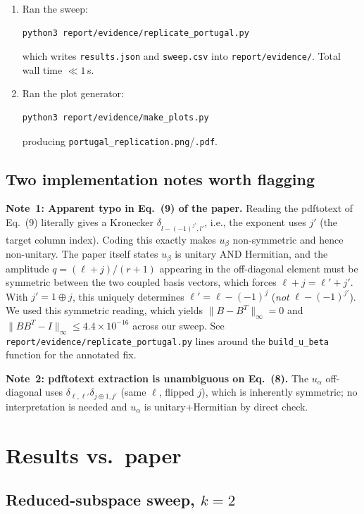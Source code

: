 \documentclass[11pt]{article}
\begin{document}
\begin{enumerate}[leftmargin=*,itemsep=0.2em]
        (correctness anchor).
  \item Ran the sweep:
    \begin{lstlisting}
python3 report/evidence/replicate_portugal.py
    \end{lstlisting}
    which writes \texttt{results.json} and \texttt{sweep.csv} into
    \texttt{report/evidence/}. Total wall time $\ll 1$\,s.
  \item Ran the plot generator:
    \begin{lstlisting}
python3 report/evidence/make_plots.py
    \end{lstlisting}
    producing \texttt{portugal\_replication.png}/\texttt{.pdf}.
\end{enumerate}

\subsection{Two implementation notes worth flagging}
\label{sec:implnotes}

\textbf{Note~1: Apparent typo in Eq.~(9) of the paper.} Reading the pdftotext
of Eq.~(9) literally gives a Kronecker $\delta_{l - (-1)^{j'}, l'}$, i.e.,
the exponent uses $j'$ (the target column index). Coding this exactly makes
$u_\beta$ non-symmetric and hence non-unitary. The paper itself states
$u_\beta$ is unitary AND Hermitian, and the amplitude
$q = (\ell + j)/(r+1)$ appearing in the off-diagonal element must be
symmetric between the two coupled basis vectors, which forces
$\ell + j = \ell' + j'$. With $j' = 1 \oplus j$, this uniquely determines
$\ell' = \ell - (-1)^{j}$ (\emph{not} $\ell - (-1)^{j'}$). We used this
symmetric reading, which yields $\|B - B^T\|_\infty = 0$ and
$\|B B^T - I\|_\infty \le 4.4\times 10^{-16}$ across our sweep. See
\texttt{report/evidence/replicate\_portugal.py} lines around the
\verb|build_u_beta| function for the annotated fix.

\textbf{Note~2: pdftotext extraction is unambiguous on Eq.~(8).} The $u_\alpha$
off-diagonal uses $\delta_{\ell,\ell'} \delta_{j \oplus 1, j'}$ (same $\ell$,
flipped $j$), which is inherently symmetric; no interpretation is needed
and $u_\alpha$ is unitary+Hermitian by direct check.

\section{Results vs.\ paper}
\label{sec:results}

\subsection{Reduced-subspace sweep, $k=2$}
\end{document}
